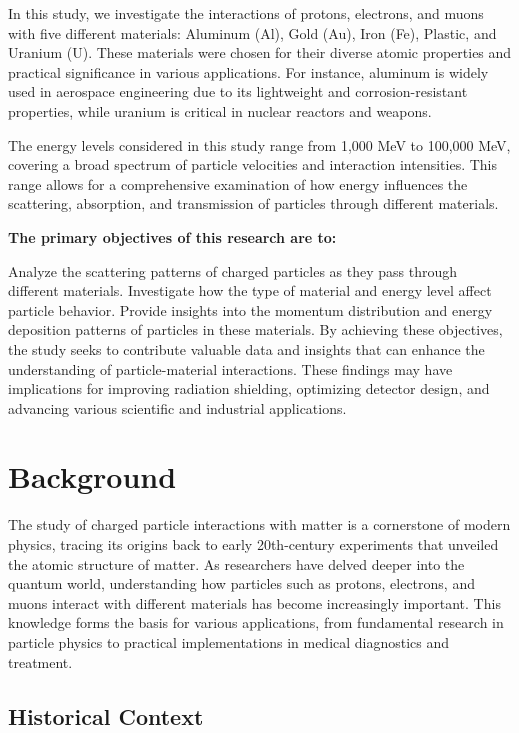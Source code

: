 \documentclass{article}
\begin{document}
In this study, we investigate the interactions of protons, electrons, and muons with five different materials: Aluminum (Al), Gold (Au), Iron (Fe), Plastic, and Uranium (U). These materials were chosen for their diverse atomic properties and practical significance in various applications. For instance, aluminum is widely used in aerospace engineering due to its lightweight and corrosion-resistant properties, while uranium is critical in nuclear reactors and weapons.

The energy levels considered in this study range from 1,000 MeV to 100,000 MeV, covering a broad spectrum of particle velocities and interaction intensities. This range allows for a comprehensive examination of how energy influences the scattering, absorption, and transmission of particles through different materials.

\noindent\textbf{The primary objectives of this research are to:}

Analyze the scattering patterns of charged particles as they pass through different materials.
Investigate how the type of material and energy level affect particle behavior.
Provide insights into the momentum distribution and energy deposition patterns of particles in these materials.
By achieving these objectives, the study seeks to contribute valuable data and insights that can enhance the understanding of particle-material interactions. These findings may have implications for improving radiation shielding, optimizing detector design, and advancing various scientific and industrial applications.

\section{Background}

The study of charged particle interactions with matter is a cornerstone of modern physics, tracing its origins back to early 20th-century experiments that unveiled the atomic structure of matter. As researchers have delved deeper into the quantum world, understanding how particles such as protons, electrons, and muons interact with different materials has become increasingly important. This knowledge forms the basis for various applications, from fundamental research in particle physics to practical implementations in medical diagnostics and treatment.

\subsection{Historical Context}
\end{document}
